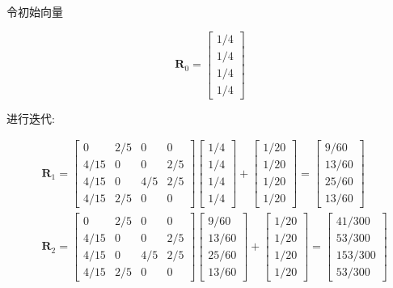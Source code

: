 \documentclass[10pt]{article}
\begin{document}
\begin{CJK*}{UTF8}{bsmi}
令初始向量

$$
\boldsymbol{R}_{0}=\left[\begin{array}{c}
1 / 4 \\
1 / 4 \\
1 / 4 \\
1 / 4
\end{array}\right]
$$

进行迭代:

$$
\begin{aligned}
& \boldsymbol{R}_{1}=\left[\begin{array}{cccc}
0 & 2 / 5 & 0 & 0 \\
4 / 15 & 0 & 0 & 2 / 5 \\
4 / 15 & 0 & 4 / 5 & 2 / 5 \\
4 / 15 & 2 / 5 & 0 & 0
\end{array}\right]\left[\begin{array}{c}
1 / 4 \\
1 / 4 \\
1 / 4 \\
1 / 4
\end{array}\right]+\left[\begin{array}{c}
1 / 20 \\
1 / 20 \\
1 / 20 \\
1 / 20
\end{array}\right]=\left[\begin{array}{c}
9 / 60 \\
13 / 60 \\
25 / 60 \\
13 / 60
\end{array}\right] \\
& \boldsymbol{R}_{2}=\left[\begin{array}{cccc}
0 & 2 / 5 & 0 & 0 \\
4 / 15 & 0 & 0 & 2 / 5 \\
4 / 15 & 0 & 4 / 5 & 2 / 5 \\
4 / 15 & 2 / 5 & 0 & 0
\end{array}\right]\left[\begin{array}{c}
9 / 60 \\
13 / 60 \\
25 / 60 \\
13 / 60
\end{array}\right]+\left[\begin{array}{c}
1 / 20 \\
1 / 20 \\
1 / 20 \\
1 / 20
\end{array}\right]=\left[\begin{array}{c}
41 / 300 \\
53 / 300 \\
153 / 300 \\
53 / 300
\end{array}\right]
\end{aligned}
$$


\end{CJK*}
\end{document}
